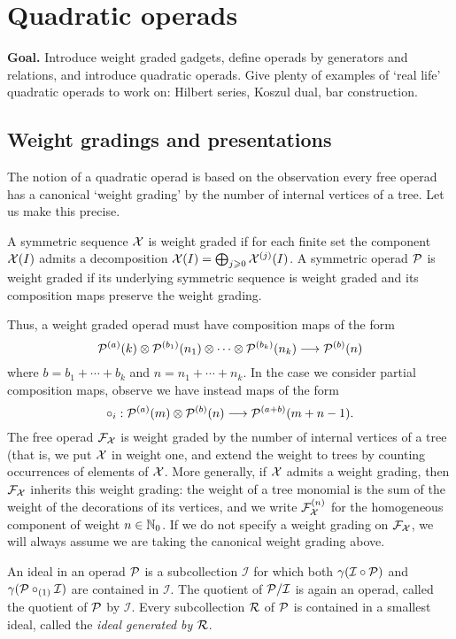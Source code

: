 \section{Quadratic operads}\label{lecture:quadraticops}

 \textbf{Goal.} Introduce weight graded gadgets,
 define operads by generators and relations, and
 introduce quadratic operads. Give plenty of examples
 of `real life' quadratic operads to work on:
 Hilbert series, Koszul dual, bar construction. 
 
 \subsection{Weight gradings and presentations}
 The notion of a quadratic operad is based on the observation
 every free operad has a canonical `weight grading' by the
 number of internal vertices of a tree. Let us make this
 precise.
 
\begin{definition}
A symmetric sequence $\mathcal{X}$ is weight graded if for
each finite set the component $\mathcal{X}(I)$ admits a 
decomposition $\mathcal{X}(I) = \bigoplus_{j\geqslant 0}
\mathcal{X}^{(j)}(I)$. A symmetric operad ${\mathcal{P}}$ is weight
graded if its underlying symmetric sequence
is weight graded and its composition maps
preserve the weight grading.
\end{definition}

Thus, a weight graded operad must have composition maps 
of the form
\[ {\mathcal{P}}^{(a)}(k) \otimes 
	{\mathcal{P}}^{(b_1)}(n_1) \otimes \cdots \otimes {\mathcal{P}}^{(b_k)}(n_k)
	 	\longrightarrow {\mathcal{P}}^{(b)}(n) \]
where $b=b_1+\cdots+b_k$ and $n = n_1+\cdots+n_k$. In the
case we consider partial composition maps, observe we have
instead maps of the form
\[\circ_i :  {\mathcal{P}}^{(a)}(m)\otimes  {\mathcal{P}}^{(b)}(n)
	\longrightarrow  {\mathcal{P}}^{(a+b)}(m+n-1). \] 
The free operad $\mathcal{F}_{\mathcal{X}}$ is weight graded by the number
of internal vertices of a tree (that is, we put $\mathcal{X}$ in
weight one, and extend the weight to trees by counting 
occurrences of elements of $\mathcal{X}$. More generally, if
$\mathcal{X}$ admits a weight grading, then $\mathcal{F}_{\mathcal{X}}$ inherits
this weight grading: the weight of a tree monomial is the
sum of the weight of the decorations of its vertices,
 and we write $\mathcal{F}_{\mathcal{X}}^{(n)}$ for the
homogeneous component of weight $n\in\mathbb N_0$. If we do
not specify a weight grading on $\mathcal{F}_{\mathcal{X}}$, we will 
always assume we are taking the canonical weight grading above.


\begin{definition} An ideal in an operad ${\mathcal{P}}$
is a subcollection $\mathcal{I}$ for which
both $\gamma(\mathcal{I}\circ {\mathcal{P}})$ and
$\gamma({\mathcal{P}}\circ_{(1)} \mathcal{I})$ are contained in
$\mathcal{I}$.
The quotient of ${\mathcal{P}}/\mathcal{I}$ is again an
operad, called the quotient of ${\mathcal{P}}$ 
by $\mathcal{I}$. Every subcollection $\mathcal{R}$
of ${\mathcal{P}}$ is contained in a smallest
ideal, called the \emph{ideal generated by $\mathcal{R}$}.
\end{definition}

